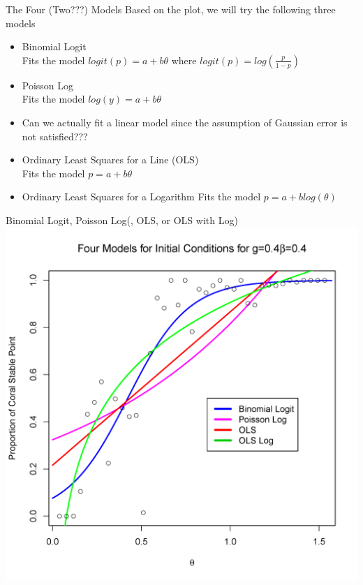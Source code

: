\begin{frame}{The Four (Two???) Models}
Based on the plot, we will try the following three models
\begin{itemize}
\item Binomial Logit\\
Fits the model $logit(p)=a+b\theta$ where $logit(p)=log(\frac{p}{1-p})$\\
\item Poisson Log\\
Fits the model $log(y)=a+b\theta$\\
\item \color{red} Can we actually fit a linear model since the assumption of Gaussian error is not satisfied???\\
\item \color{black} Ordinary Least Squares for a Line (OLS)\\
Fits the model $p=a+b\theta$\\
\item Ordinary Least Squares for a Logarithm
Fits the model $p=a+blog(\theta)$
\end{itemize}
\end{frame}


\begin{frame}{Binomial Logit, Poisson Log(, OLS, or OLS with Log)}
\includegraphics[scale=.325]{theta_fourmodels.png}
\end{frame}

